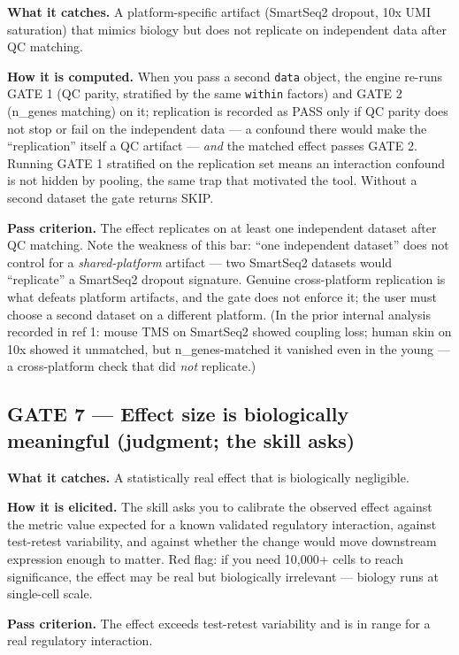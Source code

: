 \documentclass[
  11pt,
]{article}
\begin{document}
\textbf{What it catches.} A platform-specific artifact (SmartSeq2
dropout, 10x UMI saturation) that mimics biology but does not replicate
on independent data after QC matching.

\textbf{How it is computed.} When you pass a second \texttt{data}
object, the engine re-runs GATE 1 (QC parity, stratified by the same
\texttt{within} factors) and GATE 2 (n\_genes matching) on it;
replication is recorded as PASS only if QC parity does not stop or fail
on the independent data --- a confound there would make the
``replication'' itself a QC artifact --- \emph{and} the matched effect
passes GATE 2. Running GATE 1 stratified on the replication set means an
interaction confound is not hidden by pooling, the same trap that
motivated the tool. Without a second dataset the gate returns SKIP.

\textbf{Pass criterion.} The effect replicates on at least one
independent dataset after QC matching. Note the weakness of this bar:
``one independent dataset'' does not control for a
\emph{shared-platform} artifact --- two SmartSeq2 datasets would
``replicate'' a SmartSeq2 dropout signature. Genuine cross-platform
replication is what defeats platform artifacts, and the gate does not
enforce it; the user must choose a second dataset on a different
platform. (In the prior internal analysis recorded in ref 1: mouse TMS
on SmartSeq2 showed coupling loss; human skin on 10x showed it
unmatched, but n\_genes-matched it vanished even in the young --- a
cross-platform check that did \emph{not} replicate.)

\subsection{GATE 7 --- Effect size is biologically meaningful (judgment;
the skill
asks)}\label{gate-7-effect-size-is-biologically-meaningful-judgment-the-skill-asks}

\textbf{What it catches.} A statistically real effect that is
biologically negligible.

\textbf{How it is elicited.} The skill asks you to calibrate the
observed effect against the metric value expected for a known validated
regulatory interaction, against test-retest variability, and against
whether the change would move downstream expression enough to matter.
Red flag: if you need 10,000+ cells to reach significance, the effect
may be real but biologically irrelevant --- biology runs at single-cell
scale.

\textbf{Pass criterion.} The effect exceeds test-retest variability and
is in range for a real regulatory interaction.
\end{document}
